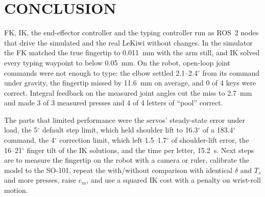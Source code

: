 \documentclass[letterpaper, 10 pt, conference]{ieeeconf}
\begin{document}
\section{CONCLUSION}
\label{sec:conclusion}
FK, IK, the end-effector controller and the typing controller run as ROS~2 nodes that drive the simulated
and the real LeKiwi without changes. In the simulator the FK matched the true fingertip to 0.011~mm with the
arm still, and IK solved every typing waypoint to below 0.05~mm. On the robot, open-loop joint commands were
not enough to type: the elbow settled 2.1--2.4$^\circ$ from its command under gravity, the fingertip missed by
11.6~mm on average, and 0 of 4 keys were correct. Integral feedback on the measured joint angles cut the miss
to 2.7~mm and made 3 of 3 measured presses and 4 of 4 letters of ``pool'' correct.

The parts that limited performance were the servos' steady-state error under load, the 5$^\circ$ default step
limit, which held shoulder lift to 16.3$^\circ$ of a 183.4$^\circ$ command, the 4$^\circ$ correction limit,
which left 1.5--1.7$^\circ$ of shoulder-lift error, the 16--21$^\circ$ finger tilt of the IK solutions, and
the time per letter, 15.2~s. Next steps are to measure the fingertip on the robot with a camera or ruler,
calibrate the model to the SO-101, repeat the with/without comparison with identical $\delta$ and $T_s$ and
more presses, raise $c_m$, and use a squared IK cost with a penalty on wrist-roll motion.
\end{document}
